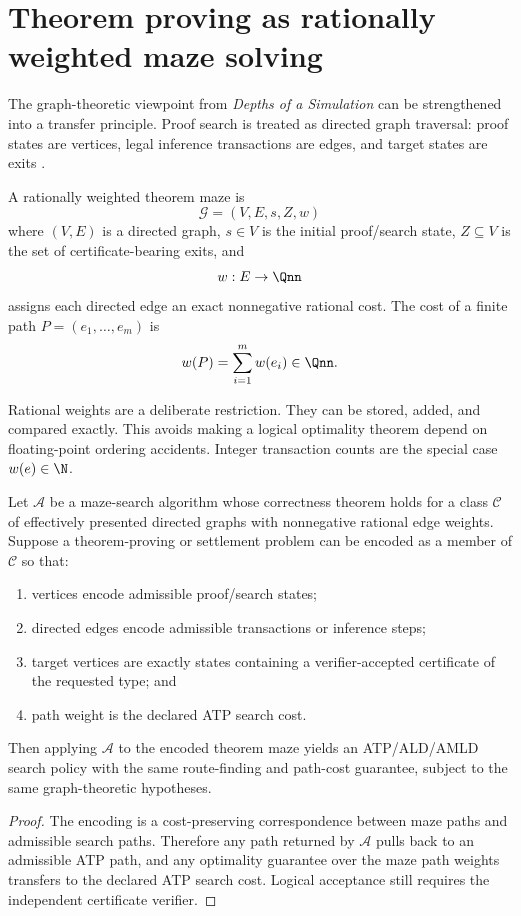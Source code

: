 \section{Theorem proving as rationally weighted maze solving}
The graph-theoretic viewpoint from \emph{Depths of a Simulation} can be strengthened into a transfer principle. Proof search is treated as directed graph traversal: proof states are vertices, legal inference transactions are edges, and target states are exits \cite{depths}.

\begin{definition}
A rationally weighted theorem maze is
\[
\mathcal G=(V,E,s,Z,w)
\]
where $(V,E)$ is a directed graph, $s\in V$ is the initial proof/search state, $Z\subseteq V$ is the set of certificate-bearing exits, and
\[
w:E\to\Qnn
\]
assigns each directed edge an exact nonnegative rational cost. The cost of a finite path $P=(e_1,\ldots,e_m)$ is
\[
w(P)=\sum_{i=1}^{m}w(e_i)\in\Qnn.
\]
\end{definition}

Rational weights are a deliberate restriction. They can be stored, added, and compared exactly. This avoids making a logical optimality theorem depend on floating-point ordering accidents. Integer transaction counts are the special case $w(e)\in\N$.

\begin{theorem}
Let $\mathcal A$ be a maze-search algorithm whose correctness theorem holds for a class $\mathscr C$ of effectively presented directed graphs with nonnegative rational edge weights. Suppose a theorem-proving or settlement problem can be encoded as a member of $\mathscr C$ so that:
\begin{enumerate}[label=(\roman*)]
\item vertices encode admissible proof/search states;
\item directed edges encode admissible transactions or inference steps;
\item target vertices are exactly states containing a verifier-accepted certificate of the requested type; and
\item path weight is the declared ATP search cost.
\end{enumerate}
Then applying $\mathcal A$ to the encoded theorem maze yields an ATP/ALD/AMLD search policy with the same route-finding and path-cost guarantee, subject to the same graph-theoretic hypotheses.
\end{theorem}
\begin{proof}
The encoding is a cost-preserving correspondence between maze paths and admissible search paths. Therefore any path returned by $\mathcal A$ pulls back to an admissible ATP path, and any optimality guarantee over the maze path weights transfers to the declared ATP search cost. Logical acceptance still requires the independent certificate verifier.
\end{proof}

